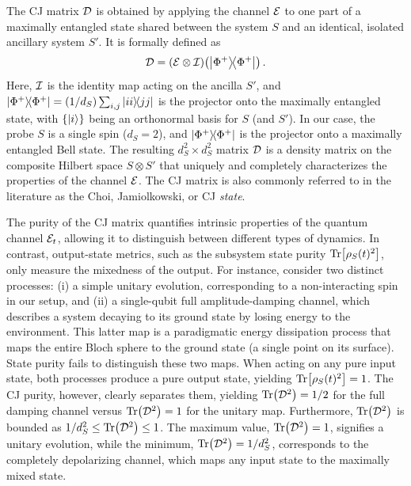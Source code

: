 \documentclass[letterpaper,superscriptaddress,aps,pra,nolongbibliography,showpacs,floatfix,dvipsnames,10pt,twocolumn]{revtex4-2}
\begin{document}
The CJ matrix $\mathcal{D}$ is obtained by applying the channel $\mathcal{E}$
to one part of a maximally entangled state shared between the system $S$
and an identical, isolated ancillary system $S'$. It is formally defined as
\begin{equation}\label{eq:choi_def}
\mcD = (\mcE \otimes \mcI)\qty(\dyad{\Phi^+}) \, .
\end{equation}
Here, $\mathcal{I}$ is the identity map acting on the ancilla $S'$, and
$\dyad{\Phi^+} = (1/d_S) \sum_{i,j} \dyad{ii}{jj}$ is the projector onto
the maximally entangled state, with $\{ \ket{i} \}$ being an orthonormal basis
for $S$ (and $S'$). In our case, the probe $S$ is a single spin
($d_S = 2$), and $\dyad{\Phi^+}$ is the projector onto a maximally
entangled Bell state.
The resulting $d_S^2 \times d_S^2$ matrix $\mathcal{D}$ is a density matrix
on the composite Hilbert space $S \otimes S'$ that uniquely and completely
characterizes the properties of the channel $\mathcal{E}$.
The CJ matrix is also commonly referred to in the literature as the
Choi, Jamiolkowski, or CJ \textit{state}. 

The purity of the CJ matrix quantifies intrinsic
properties of the quantum channel $\mathcal{E}_t$, allowing it to
distinguish between different types of dynamics.
In contrast, output-state metrics, such as
the subsystem state purity $\Tr[\rho_S(t)^2]$, only measure the
mixedness of the output.
For instance, consider two distinct processes: (i) a simple unitary
evolution, corresponding to a non-interacting spin in our setup, and
(ii) a single-qubit full amplitude-damping channel, which describes a
system decaying to its ground state by losing energy to the environment.
This latter map is a paradigmatic energy dissipation process that maps the
entire Bloch sphere to the ground state (a single point on its surface).
State purity fails to distinguish these two maps. When acting on any
pure input state, both processes produce a pure output state, yielding
$\Tr[\rho_S(t)^2]=1$. The CJ purity, however,
clearly separates them, yielding $\Tr(\mathcal{D}^2) = 1/2$ for the
full damping channel versus $\Tr(\mathcal{D}^2) = 1$ for the unitary map. Furthermore, $\Tr(\mathcal{D}^2)$ is bounded as $1/d_S^2 \le \Tr(\mathcal{D}^2) \le 1$.
The maximum value, $\Tr(\mathcal{D}^2)=1$, signifies a unitary evolution, while
the minimum, $\Tr(\mathcal{D}^2)=1/d_S^2$, corresponds to the completely
depolarizing channel, which maps any input state to the maximally
mixed state.
\end{document}
